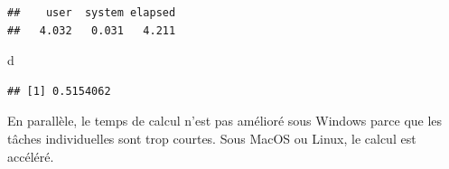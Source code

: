 \documentclass[
  12pt,
  french,
  a4paper,
  extrafontsizes,onecolumn,openright
  ]{memoir}
\newenvironment{Shaded}{\begin{snugshade}}{\end{snugshade}}
\newcommand{\ControlFlowTok}[1]{\textcolor[rgb]{0.13,0.29,0.53}{\textbf{#1}}}
\newcommand{\DecValTok}[1]{\textcolor[rgb]{0.00,0.00,0.81}{#1}}
\newcommand{\KeywordTok}[1]{\textcolor[rgb]{0.13,0.29,0.53}{\textbf{#1}}}
\newcommand{\NormalTok}[1]{#1}
\newcommand{\OperatorTok}[1]{\textcolor[rgb]{0.81,0.36,0.00}{\textbf{#1}}}
\newcommand{\StringTok}[1]{\textcolor[rgb]{0.31,0.60,0.02}{#1}}
\begin{document}
\begin{verbatim}
##    user  system elapsed 
##   4.032   0.031   4.211
\end{verbatim}

\begin{Shaded}
\begin{Highlighting}[]
\NormalTok{d}
\end{Highlighting}
\end{Shaded}

\begin{verbatim}
## [1] 0.5154062
\end{verbatim}

\normalsize

En parallèle, le temps de calcul n'est pas amélioré sous Windows parce que les tâches individuelles sont trop courtes.
Sous MacOS ou Linux, le calcul est accéléré.

\scriptsize

\begin{Shaded}
\end{Shaded}
\end{document}
